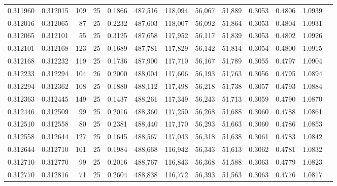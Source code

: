 \begin{tabular}{rrrrrrrrrrrrr}
0.311960 & 0.312015 &   109 &  25 &                                     0.1866 & 487,516 & 118,094 &  56,067 &  51,889 & 0.3053 & 0.4806 & 1.0939 \\
0.312016 & 0.312065 &    87 &  25 &                                     0.2232 & 487,603 & 118,007 &  56,092 &  51,864 & 0.3053 & 0.4804 & 1.0931 \\
0.312065 & 0.312101 &    55 &  25 &                                     0.3125 & 487,658 & 117,952 &  56,117 &  51,839 & 0.3053 & 0.4802 & 1.0926 \\
0.312101 & 0.312168 &   123 &  25 &                                     0.1689 & 487,781 & 117,829 &  56,142 &  51,814 & 0.3054 & 0.4800 & 1.0915 \\
0.312168 & 0.312232 &   119 &  25 &                                     0.1736 & 487,900 & 117,710 &  56,167 &  51,789 & 0.3055 & 0.4797 & 1.0904 \\
0.312233 & 0.312294 &   104 &  26 &                                     0.2000 & 488,004 & 117,606 &  56,193 &  51,763 & 0.3056 & 0.4795 & 1.0894 \\
0.312294 & 0.312362 &   108 &  25 &                                     0.1880 & 488,112 & 117,498 &  56,218 &  51,738 & 0.3057 & 0.4793 & 1.0884 \\
0.312363 & 0.312445 &   149 &  25 &                                     0.1437 & 488,261 & 117,349 &  56,243 &  51,713 & 0.3059 & 0.4790 & 1.0870 \\
0.312446 & 0.312509 &    99 &  25 &                                     0.2016 & 488,360 & 117,250 &  56,268 &  51,688 & 0.3060 & 0.4788 & 1.0861 \\
0.312510 & 0.312558 &    80 &  25 &                                     0.2381 & 488,440 & 117,170 &  56,293 &  51,663 & 0.3060 & 0.4786 & 1.0853 \\
0.312558 & 0.312644 &   127 &  25 &                                     0.1645 & 488,567 & 117,043 &  56,318 &  51,638 & 0.3061 & 0.4783 & 1.0842 \\
0.312644 & 0.312710 &   101 &  25 &                                     0.1984 & 488,668 & 116,942 &  56,343 &  51,613 & 0.3062 & 0.4781 & 1.0832 \\
0.312710 & 0.312770 &    99 &  25 &                                     0.2016 & 488,767 & 116,843 &  56,368 &  51,588 & 0.3063 & 0.4779 & 1.0823 \\
0.312770 & 0.312816 &    71 &  25 &                                     0.2604 & 488,838 & 116,772 &  56,393 &  51,563 & 0.3063 & 0.4776 & 1.0817 \\

\end{tabular}
